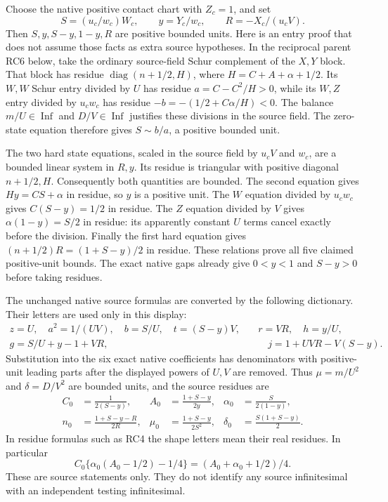 Choose the native positive contact chart with $Z_c=1$, and set
\[
 S=(u_c/w_c)W_c,\qquad y=Y_c/w_c,\qquad
 R=-X_c/(u_cV).
 \tag{RC2}
\]
Then $S,y,S-y,1-y,R$ are positive bounded units. Here is an entry
proof that does not assume those facts as extra source hypotheses.
In the reciprocal parent RC6 below, take the ordinary source-field
Schur complement of the $X,Y$ block. That block has residue
$\operatorname{diag}(n+1/2,H)$, where $H=C+A+\alpha+1/2$.
Its $W,W$ Schur entry divided by $U$ has residue
$a=C-C^2/H>0$, while its $W,Z$ entry divided by $u_cw_c$
has residue $-b=-(1/2+C\alpha/H)<0$. The balance
$m/U\in\operatorname{Inf}$ and $D/V\in\operatorname{Inf}$
justifies these divisions in the source field. The zero-state
equation therefore gives $S\sim b/a$, a positive bounded unit.

The two hard state equations, scaled in the source field by
$u_cV$ and $w_c$, are a bounded linear system in $R,y$. Its
residue is triangular with positive diagonal $n+1/2,H$.
Consequently both quantities are bounded. The second equation gives
$Hy=CS+\alpha$ in residue, so $y$ is a positive unit. The
$W$ equation divided by $u_cw_c$ gives
$C(S-y)=1/2$ in residue. The $Z$ equation divided by $V$
gives $\alpha(1-y)=S/2$ in residue: its apparently constant
$U$ terms cancel exactly before the division. Finally the first
hard equation gives $(n+1/2)R=(1+S-y)/2$ in residue. These
relations prove all five claimed positive-unit bounds. The exact
native gaps already give $0<y<1$ and $S-y>0$ before taking
residues.

The unchanged native source formulas are converted by the following
dictionary. Their letters are used only in this display:
\[
\begin{aligned}
 z=U,\quad a^2=1/(UV),\quad b=S/U,\quad t=(S-y)V,
 &\quad r=VR,\quad h=y/U,\\
 g=S/U+y-1+VR,&\qquad j=1+UVR-V(S-y).
\end{aligned}
 \tag{RC3}
\]
Substitution into the six exact native coefficients has denominators
with positive-unit leading parts after the displayed powers of
$U,V$ are removed. Thus $\mu=m/U^2$ and $\delta=D/V^2$
are bounded units, and the source residues are
\[
\begin{aligned}
 C_0&=\frac1{2(S-y)},& A_0&=\frac{1+S-y}{2y},&
 \alpha_0&=\frac{S}{2(1-y)},\\
 n_0&=\frac{1+S-y-R}{2R},&
 \mu_0&=\frac{1+S-y}{2S^2},&
 \delta_0&=\frac{S(1+S-y)}2.
\end{aligned}\tag{RC4}
\]
In residue formulas such as RC4 the shape letters mean their real
residues. In particular
\[
 C_0\{\alpha_0(A_0-1/2)-1/4\}
       =(A_0+\alpha_0+1/2)/4.
 \tag{RC5}
\]
These are source statements only. They do not identify any source
infinitesimal with an independent testing infinitesimal.


